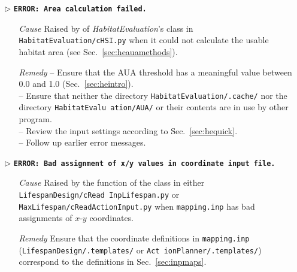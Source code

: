 \begin{itemize}
	\item[$\triangleright$]\textbf{\texttt{ERROR: Area calculation failed.}}
	\begin{itemize}
		\item[\textit{Cause}\hspace{0.27cm}] Raised by  of \textit{HabitatEvaluation}'s  class in \texttt{HabitatEvaluation/cHSI.py} when it could not calculate the usable habitat area (see Sec.~\ref{sec:heauamethods}).
		\item[\textit{Remedy}] -- Ensure that the AUA threshold has a meaningful value between 0.0 and 1.0 (Sec.~\ref{sec:heintro}).\\
							 -- Ensure that neither the directory \texttt{HabitatEvaluation/.cache/} nor the directory \texttt{HabitatEvalu ation/AUA/} or their contents are in use by other program.\\
							 -- Review the input settings according to Sec.~\ref{sec:hequick}.\\
							 -- Follow up earlier error messages.\\
	\end{itemize}
	
	\item[$\triangleright$]\textbf{\texttt{ERROR: Bad assignment of x/y values in coordinate input file.}}
	\begin{itemize}
		\item[\textit{Cause}\hspace{0.27cm}] Raised by the  function of the  class in either \texttt{LifespanDesign/cRead InpLifespan.py} or \texttt{MaxLifespan/cReadActionInput.py} when \texttt{mapping.inp} has bad assignments of $x$-$y$ coordinates.
		\item[\textit{Remedy}] Ensure that the coordinate definitions in \texttt{mapping.inp} (\texttt{LifespanDesign/.templates/} or \texttt{Act ionPlanner/.templates/}) correspond to the definitions in Sec.~\ref{sec:inpmaps}.\\
	\end{itemize}
	

\end{itemize}
